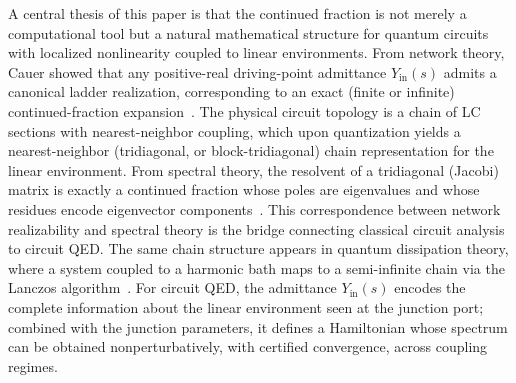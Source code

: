 \documentclass[reprint, floatfix, superscriptaddress, amsmath, amssymb, longbibliography]{revtex4-2}
\newcommand{\Yin}{Y_{\mathrm{in}}}
\begin{document}
A central thesis of this paper is that the continued fraction is not merely a computational tool but a natural mathematical structure for quantum circuits with localized nonlinearity coupled to linear environments. From network theory, Cauer showed that any positive-real driving-point admittance $\Yin(s)$ admits a canonical ladder realization, corresponding to an exact (finite or infinite) continued-fraction expansion~\cite{Brune1931, Cauer1958}. The physical circuit topology is a chain of LC sections with nearest-neighbor coupling, which upon quantization yields a nearest-neighbor (tridiagonal, or block-tridiagonal) chain representation for the linear environment. From spectral theory, the resolvent of a tridiagonal (Jacobi) matrix is exactly a continued fraction whose poles are eigenvalues and whose residues encode eigenvector components~\cite{Stieltjes1894, Chihara1978, Simon2005OPUC}. This correspondence between network realizability and spectral theory is the bridge connecting classical circuit analysis to circuit QED. The same chain structure appears in quantum dissipation theory, where a system coupled to a harmonic bath maps to a semi-infinite chain via the Lanczos algorithm~\cite{Caldeira1983, Chin2010, Prior2010}. For circuit QED, the admittance $\Yin(s)$ encodes the complete information about the linear environment seen at the junction port; combined with the junction parameters, it defines a Hamiltonian whose spectrum can be obtained nonperturbatively, with certified convergence, across coupling regimes. 
\end{document}
